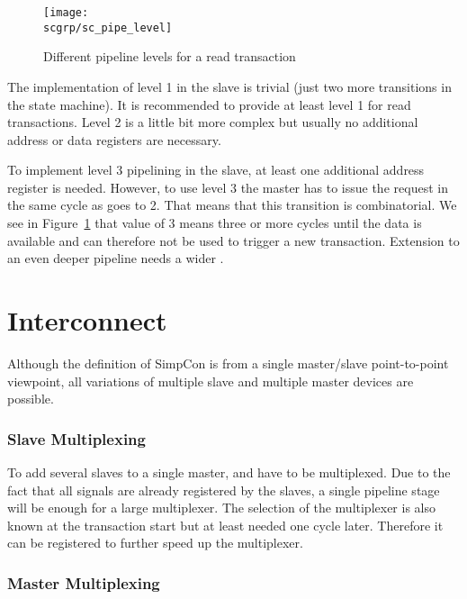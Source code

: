 \begin{figure}
    \centering
    \texttt{[image: \\scgrp/sc\_pipe\_level]}
    \caption{Different pipeline levels for a read transaction}
    \label{fig:sc:pipe:level}
\end{figure}

The implementation of level 1 in the slave is trivial (just two more
transitions in the state machine). It is recommended to provide  at
least level 1 for read transactions. Level 2 is a little bit more
complex but usually no additional address or data registers are
necessary.

To implement level 3 pipelining in the slave, at least one additional
address register is needed. However, to use level 3 the master has to
issue the request in the same cycle as  goes to 2.
That means that this transition is combinatorial. We see in
Figure~\ref{fig:sc:pipe:level} that  value of 3 means
three or more cycles until the data is available and can therefore
not be used to trigger a new transaction. Extension to an even deeper
pipeline needs a wider .


\section{Interconnect}

Although the definition of SimpCon is from a single master/slave
point-to-point viewpoint, all variations of multiple slave and
multiple master devices are possible.

\subsubsection{Slave Multiplexing}

To add several slaves to a single master,  and
 have to be multiplexed. Due to the fact that all
 signals are already registered by the slaves, a
single pipeline stage will be enough for a large multiplexer. The
selection of the multiplexer is also known at the transaction start
but at least needed one cycle later. Therefore it can be registered
to further speed up the multiplexer.


\subsubsection{Master Multiplexing}

